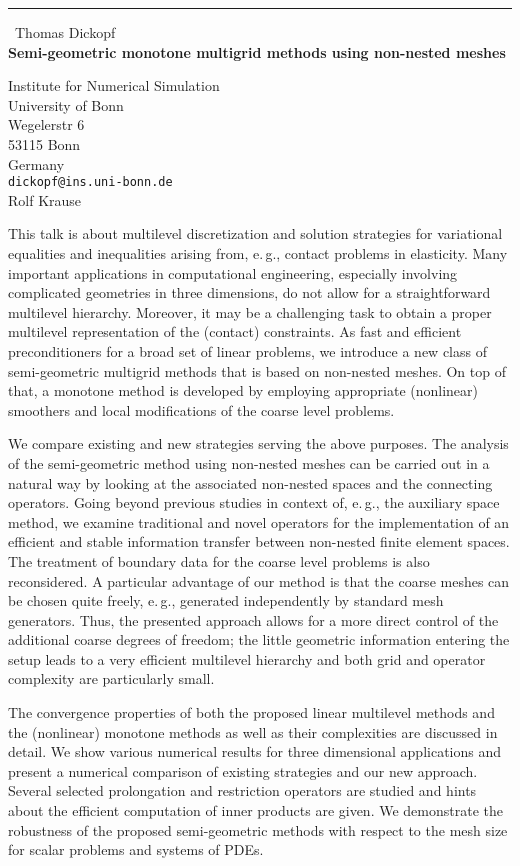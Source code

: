 \documentclass{report}
\begin{document}
\begin{center}
\rule{6in}{1pt} \
{\large Thomas Dickopf \\
{\bf Semi-geometric monotone multigrid methods using non-nested meshes}}

Institute for Numerical Simulation \\ University of Bonn \\ Wegelerstr 6 \\ 53115 Bonn \\ Germany
\\
{\tt dickopf@ins.uni-bonn.de}\\
Rolf Krause\end{center}

This talk is about multilevel discretization and solution strategies for
variational equalities and inequalities arising from, e.\,g., contact
problems in elasticity. Many important applications in computational
engineering, especially involving complicated geometries in three
dimensions, do not allow for a straightforward multilevel hierarchy.
Moreover, it may be a challenging task to obtain a proper multilevel
representation of the (contact) constraints. As fast and efficient
preconditioners for a broad set of linear problems, we introduce a new
class of semi-geometric multigrid methods that is based on non-nested
meshes. On top of that, a monotone method is developed by employing
appropriate (nonlinear) smoothers and local modifications of the coarse
level problems.

We compare existing and new strategies serving the above purposes. The
analysis of the semi-geometric method using non-nested meshes can be
carried out in a natural way by looking at the associated non-nested
spaces and the connecting operators. Going beyond previous studies in
context of, e.\,g., the auxiliary space method, we examine traditional
and novel operators for the implementation of an efficient and stable
information transfer between non-nested finite element spaces. The
treatment of boundary data for the coarse level problems is also
reconsidered. A particular advantage of our method is that the coarse
meshes can be chosen quite freely, e.\,g., generated independently by
standard mesh generators. Thus, the presented approach allows for a more
direct control of the additional coarse degrees of freedom; the little
geometric information entering the setup leads to a very efficient
multilevel hierarchy and both grid and operator complexity are
particularly small.

The convergence properties of both the proposed linear multilevel methods
and the (nonlinear) monotone methods as well as their complexities are
discussed in detail. We show various numerical results for three
dimensional applications and present a numerical comparison of existing
strategies and our new approach. Several selected prolongation and
restriction operators are studied and hints about the efficient
computation of inner products are given. We demonstrate the robustness of
the proposed semi-geometric methods with respect to the mesh size for
scalar problems and systems of PDEs.
\end{document}
